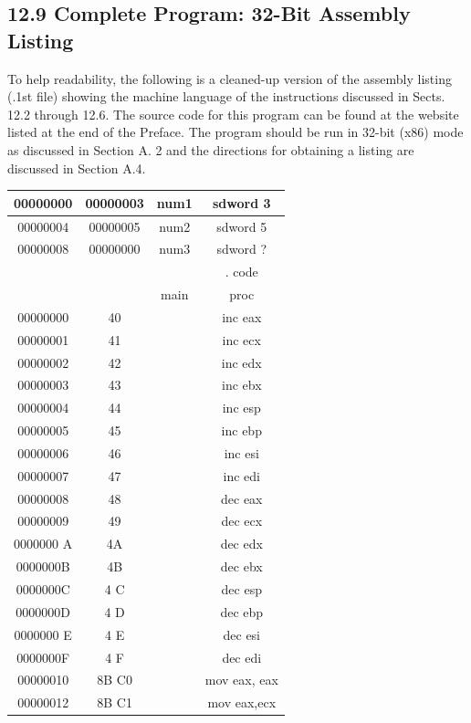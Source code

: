 \documentclass[10pt]{book}
\begin{document}
\subsection*{12.9 Complete Program: 32-Bit Assembly Listing}
To help readability, the following is a cleaned-up version of the assembly listing (.1st file) showing the machine language of the instructions discussed in Sects. 12.2 through 12.6. The source code for this program can be found at the website listed at the end of the Preface. The program should be run in 32-bit (x86) mode as discussed in Section A. 2 and the directions for obtaining a listing are discussed in Section A.4.


\begin{center}
\begin{tabular}{|c|c|c|c|}
\hline
00000000 & 00000003 & num1 & sdword 3 \\
\hline
00000004 & 00000005 & num2 & sdword 5 \\
\hline
00000008 & 00000000 & num3 & sdword ? \\
\hline
 &  &  & . code \\
\hline
 &  & main & proc \\
\hline
00000000 & 40 &  & inc eax \\
\hline
00000001 & 41 &  & inc ecx \\
\hline
00000002 & 42 &  & inc edx \\
\hline
00000003 & 43 &  & inc ebx \\
\hline
00000004 & 44 &  & inc esp \\
\hline
00000005 & 45 &  & inc ebp \\
\hline
00000006 & 46 &  & inc esi \\
\hline
00000007 & 47 &  & inc edi \\
\hline
00000008 & 48 &  & dec eax \\
\hline
00000009 & 49 &  & dec ecx \\
\hline
0000000 A & 4A &  & dec edx \\
\hline
0000000B & 4B &  & dec ebx \\
\hline
0000000C & 4 C &  & dec esp \\
\hline
0000000D & 4 D &  & dec ebp \\
\hline
0000000 E & 4 E &  & dec esi \\
\hline
0000000F & 4 F &  & dec edi \\
\hline
00000010 & 8B C0 &  & mov eax, eax \\
\hline
00000012 & 8B C1 &  & mov eax,ecx \\

\end{tabular}
\end{center}
\end{document}
